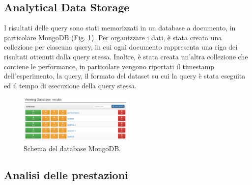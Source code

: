 \documentclass[conference]{IEEEtran}
\begin{document}
\subsection{Analytical Data Storage}
I risultati delle query sono stati memorizzati in un database a documento, in particolare MongoDB (Fig. \ref{fig:mongo}).
Per organizzare i dati, è stata creata una collezione per ciascuna query, in cui ogni documento rappresenta una riga dei risultati ottenuti dalla query stessa. Inoltre, è stata creata un'altra collezione che contiene le performance, in particolare vengono riportati il timestamp dell'esperimento, la query, il formato del dataset su cui la query è stata eseguita ed il tempo di esecuzione della query stessa.
\begin{figure}[H]
    \centerline{\includegraphics[width=0.5\textwidth]{res/mongo.png}}
    \caption{Schema del database MongoDB.}
    \label{fig:mongo}
\end{figure}
\subsection{Analisi delle prestazioni}
\vspace{12pt}
\end{document}
